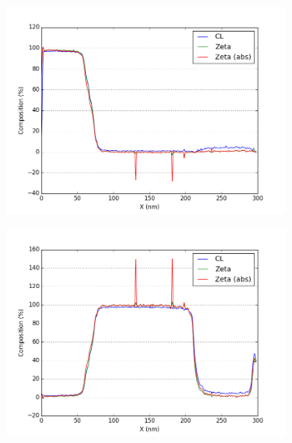 \begin{figure}
	\begin{subfigure}{.5\textwidth}
		\centering
		\includegraphics[width=\linewidth]{fig/q/2_pd_nm_GeL}
		\caption{}
		\label{fig:zeta_area2_pd}
	\end{subfigure}%
	\begin{subfigure}{.5\textwidth}
		\centering
		\includegraphics[width=\linewidth]{fig/q/2_ge_nm_GeL}
		\caption{}
		\label{fig:zeta_area2_ge}
	\end{subfigure}
	\begin{subfigure}{.5\textwidth}
		\centering

\end{subfigure}
\end{figure}
